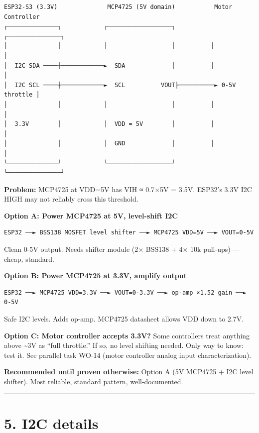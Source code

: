 \documentclass[12pt,a4paper,oneside]{report}
\begin{document}
\begin{verbatim}
ESP32-S3 (3.3V)              MCP4725 (5V domain)           Motor Controller
┌──────────────┐            ┌──────────────────┐          ┌───────────────┐
│              │            │                  │          │               │
│  I2C SDA ────┼────────────►  SDA             │          │               │
│  I2C SCL ────┼────────────►  SCL          VOUT├──────────► 0-5V throttle │
│              │            │                  │          │               │
│  3.3V        │            │  VDD = 5V        │          │               │
│              │            │  GND             │          │               │
└──────────────┘            └──────────────────┘          └───────────────┘
\end{verbatim}

\textbf{Problem:} MCP4725 at VDD=5V has VIH ≈ 0.7×5V = 3.5V. ESP32's 3.3V I2C
HIGH may not reliably cross this threshold.

\textbf{Option A: Power MCP4725 at 5V, level-shift I2C}

\begin{verbatim}
ESP32 ──► BSS138 MOSFET level shifter ──► MCP4725 VDD=5V ──► VOUT=0-5V
\end{verbatim}

Clean 0-5V output. Needs shifter module (2× BSS138 + 4× 10k pull-ups) --- cheap,
standard.

\textbf{Option B: Power MCP4725 at 3.3V, amplify output}

\begin{verbatim}
ESP32 ──► MCP4725 VDD=3.3V ──► VOUT=0-3.3V ──► op-amp ×1.52 gain ──► 0-5V
\end{verbatim}

Safe I2C levels. Adds op-amp. MCP4725 datasheet allows VDD down to 2.7V.

\textbf{Option C: Motor controller accepts 3.3V?} Some controllers treat
anything above \textasciitilde3V as ``full throttle.'' If so, no level shifting
needed. Only way to know: test it. See parallel task WO-14 (motor controller
analog input characterization).

\textbf{Recommended until proven otherwise:} Option A (5V MCP4725 + I2C level
shifter). Most reliable, standard pattern, well-documented.

\begin{center}\rule{0.5\linewidth}{0.5pt}\end{center}

\section{5. I2C details}\label{i2c-details}
\end{document}
